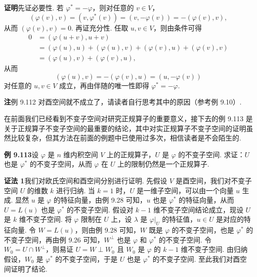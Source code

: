 \documentclass[UTF8, 12pt, fontset=fandol, oneside]{ctexart}
\begin{document}
\noindent\textbf{证明}\quad 先证必要性. 若 $\varphi^*=-\varphi$，则对任意的 $v\in V$，
\[
(\varphi(v),v)=(v,\varphi^*(v))=(v,-\varphi(v))=-(\varphi(v),v),
\]
从而 $(\varphi(v),v)=0$. 再证充分性. 任取 $u,v\in V$，则由条件可得
\[
\begin{aligned}
0&=(\varphi(u+v),u+v)\\
&=(\varphi(u),u)+(\varphi(u),v)+(\varphi(v),u)+(\varphi(v),v)\\
&=(\varphi(u),v)+(\varphi(v),u),
\end{aligned}
\]
从而
\[
(\varphi(u),v)=-(\varphi(v),u)=(u,-\varphi(v))
\]
对任意的 $u,v\in V$ 成立，再由伴随的唯一性即得 $\varphi^*=-\varphi$.

\noindent\textbf{注}\quad 例 9.112 对酉空间就不成立了，请读者自行思考其中的原因（参考例 9.10）.

在前面我们已经看到不变子空间对研究正规算子的重要意义，接下去的例 9.113 是关于正规算子不变子空间的最重要的结论，其中对实正规算子不变子空间的证明虽然比较复杂，但其方法在前面的例题中已使用过多次，相信读者是不会陌生的.

\noindent\textbf{例 9.113}\quad 设 $\varphi$ 是 $n$ 维内积空间 $V$ 上的正规算子，$U$ 是 $\varphi$ 的不变子空间. 求证：$U$ 也是 $\varphi^*$ 的不变子空间，从而 $\varphi$ 在 $U$ 上的限制仍然是一个正规算子.

\noindent\textbf{证法 1}\quad 我们对欧氏空间和酉空间分别进行证明. 先假设 $V$ 是酉空间，我们对不变子空间 $U$ 的维数 $k$ 进行归纳. 当 $k=1$ 时，$U$ 是一维子空间，可以由一个向量 $u$ 生成. 显然 $u$ 是 $\varphi$ 的特征向量，由例 9.28 可知，$u$ 也是 $\varphi^*$ 的特征向量，从而 $U=L(u)$ 也是 $\varphi^*$ 的不变子空间. 假设对 $k-1$ 维不变子空间结论成立，现设 $U$ 是 $k$ 维不变子空间. 将 $\varphi$ 限制在 $U$ 上，设 $\lambda$ 是 $\varphi|_U$ 的特征值，$u\in U$ 是对应的特征向量. 令 $W=L(u)$，则由例 9.28 可知，$W$ 既是 $\varphi$ 的不变子空间，也是 $\varphi^*$ 的不变子空间，再由例 9.26 可知，$W^\perp$ 也是 $\varphi$ 和 $\varphi^*$ 的不变子空间. 令 $W_0=U\cap W^\perp$，则易证 $U=W\perp W_0$ 且 $W_0$ 是 $\varphi$ 的 $k-1$ 维不变子空间. 由归纳假设，$W_0$ 是 $\varphi^*$ 的不变子空间，于是 $U$ 也是 $\varphi^*$ 的不变子空间. 至此我们对酉空间证明了结论.
\end{document}
